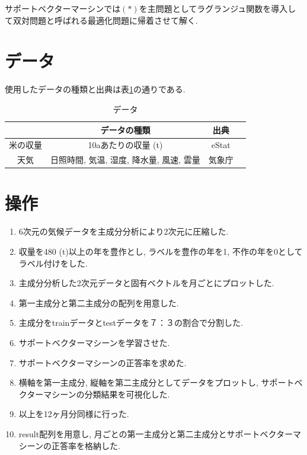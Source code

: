 \documentclass{jarticle}
\begin{document}
サポートベクターマーシンでは$(*)$を主問題としてラグランジュ関数を導入して双対問題と呼ばれる最適化問題に帰着させて解く.


 
\hypertarget{header-n2013}{%
\section{データ}\label{header-n2013}}
使用したデータの種類と出典は表\ref{data}の通りである.

\begin{table}[H]
\caption{データ}
\begin{tabular}{|c|c|c|c|} \hline
&データの種類&出典\\ \hline
米の収量&10aあたりの収量 (t)&eStat\\ \hline
天気&日照時間, 気温, 湿度, 降水量, 風速, 雲量&気象庁\\ \hline
\end{tabular}
\centering
\label{data}
\end{table}


\hypertarget{header-n2026}{%
\section{操作}\label{header-n2026}}

\begin{enumerate}
\def\labelenumi{\arabic{enumi}.}
\item
  6次元の気候データを主成分分析により2次元に圧縮した.
\item
  収量を480 (t)以上の年を豊作とし, ラベルを豊作の年を1,
  不作の年を0としてラベル付けをした.
\item
  主成分分析した2次元データと固有ベクトルを月ごとにプロットした.
\item
  第一主成分と第二主成分の配列を用意した.
\item
  主成分をtrainデータとtestデータを７：３の割合で分割した.
\item
  サポートベクターマシーンを学習させた.
\item
  サポートベクターマシーンの正答率を求めた.
\item
  横軸を第一主成分, 縦軸を第二主成分としてデータをプロットし,
  サポートベクターマシーンの分類結果を可視化した.
\item
  以上を12ヶ月分同様に行った.
\item
  result配列を用意し,
  月ごとの第一主成分と第二主成分とサポートベクターマシーンの正答率を格納した.
\end{enumerate}
\end{document}

